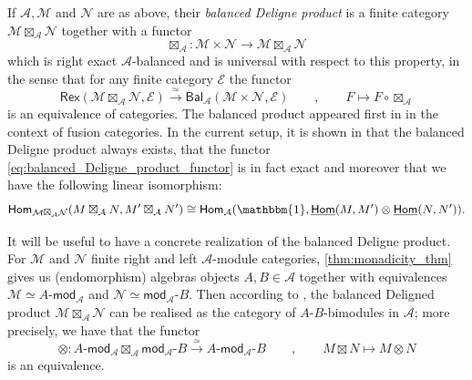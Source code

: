 \documentclass[11pt]{article}
\theoremstyle{definition}
\begin{document}
If $\mathcal{A}, \mathcal{M}$ and $\mathcal{N}$ are as above, their \emph{balanced Deligne product} is a finite category $\mathcal{M} \boxtimes_\mathcal{A} \mathcal{N}$ together with a functor
\begin{equation}\label{eq:balanced_Deligne_product_functor}
\boxtimes_\mathcal{A} : \mathcal{M} \times \mathcal{N} \longrightarrow \mathcal{M} \boxtimes_\mathcal{A} \mathcal{N}
\end{equation}
which is right exact $\mathcal{A}$-balanced and is universal with respect to this property, in the sense that for any finite category $\mathcal{E}$ the functor
$$ \mathsf{Rex} (\mathcal{M} \boxtimes_\mathcal{A} \mathcal{N}, \mathcal{E}) \overset{\simeq}{\longrightarrow} \mathsf{Bal}_\mathcal{A} (\mathcal{M} \times \mathcal{N} , \mathcal{E}) \qquad , \qquad F \longmapsto F \circ \boxtimes_\mathcal{A}  $$
is an equivalence of categories. The balanced product appeared first in \cite{eno_fc} in the context of fusion categories. In the current setup, it is shown in \cite[Theorem 3.3]{dss} that the balanced Deligne product always exists, that the functor \eqref{eq:balanced_Deligne_product_functor} is in fact exact and moreover that we have the following linear isomorphism:
\begin{equation}\label{eq:iso_DSS}
\mathsf{Hom}_{\mathcal{M} \boxtimes_\mathcal{A} \mathcal{N}}(M \boxtimes_\mathcal{A} N, M' \boxtimes_\mathcal{A} N') \cong \mathsf{Hom}_\mathcal{A} (\mathbbm{1}, \underline{\mathsf{Hom}}(M,M') \otimes \underline{\mathsf{Hom}}(N,N')).
\end{equation}

It will be useful to have a concrete realization of the balanced Deligne product. For $\mathcal{M}$ and $\mathcal{N}$  finite right and left $\mathcal{A}$-module categories, \cref{thm:monadicity_thm} gives us (endomorphism) algebras objects $A, B \in \mathcal{A}$ together with equivalences $\mathcal{M} \simeq A \text{-} \mathsf{mod}_\mathcal{A}$ and $ \mathcal{N} \simeq \mathsf{mod}_\mathcal{A}  \text{-} B$. Then according to \cite[Theorem 3.3]{dss}, the balanced Deligned product $\mathcal{M} \boxtimes_\mathcal{A} \mathcal{N} $ can be realised as the category of $A$-$B$-bimodules in $\mathcal{A}$; more precisely, we have that the functor
\begin{equation}\label{eq:equiv_balanced_Deligne}
\otimes: A \text{-} \mathsf{mod}_\mathcal{A} \boxtimes_\mathcal{A} \mathsf{mod}_\mathcal{A}  \text{-} B \overset{\simeq}{\longrightarrow} A\text{-}\mathsf{mod}_\mathcal{A}\text{-}B \qquad , \qquad M \boxtimes N \longmapsto M \otimes N
\end{equation}
is an equivalence.
\end{document}
